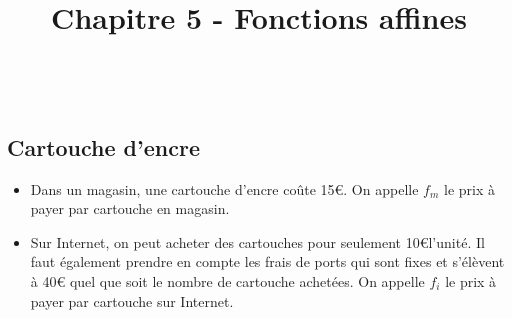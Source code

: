 \documentclass[paper=a4, fontsize=9pt]{scrartcl} %
\title{
  \vspace{-10ex}
  \horrule{0.5pt} \\[0.4cm] %
  \huge Chapitre 5 - Fonctions affines\\ %
  \horrule{2pt} \\[0.5cm] %
}
\author{}
\date{\vspace{-10ex}} %
\begin{document}

\newtheorem{Definition}{Définition}
\newtheorem{Theorem}{Théorème}
\newtheorem{Proposition}{Propriété}

\renewcommand{\labelitemi}{$\bullet$}
\renewcommand{\labelitemii}{$\circ$}

\setlength{\columnseprule}{1pt}


\subsection*{Cartouche d'encre}

\begin{itemize}
\item Dans un magasin, une cartouche d'encre coûte 15\euro. On appelle $f_m$ le prix à payer par cartouche en magasin.
\item Sur Internet, on peut acheter des cartouches pour seulement 10\euro \text{ }l'unité. Il faut également prendre en compte les frais de ports qui sont fixes et s'élèvent à 40\euro \text{ } quel que soit le nombre de cartouche achetées. On appelle $f_i$ le prix à payer par cartouche sur Internet.
\end{itemize}
\end{document}
